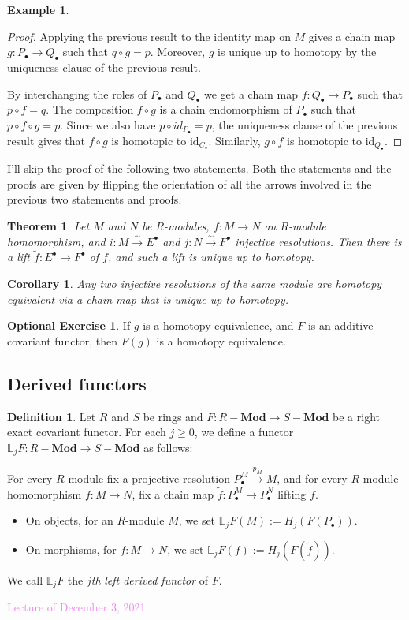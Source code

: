 \documentclass{amsart}[12pt]
\newcommand{\id}{\mathrm{id}}
\newcommand{\Dec}[1]{\textcolor{violet}{Lecture of December #1, 2021}}
\newcommand{\bL}{{\mathbb{L}}}
\newcommand{\DEF}[1]{\emph{#1}\index{#1}}
\numberwithin{equation}{section}
\theoremstyle{plain} %
\newtheorem{thm}[equation]{Theorem}
\newtheorem{cor}[equation]{Corollary}
\theoremstyle{definition}
\newtheorem{defn}[equation]{Definition}
\newtheorem{ex}[equation]{Example}
\newtheorem{exer}[equation]{Optional Exercise}
\theoremstyle{remark}
\newcommand{\ssec}[1]{\subsection{#1}}
\newcommand{\xra}[1]{\xrightarrow{#1}}
\newcommand{\Mod}[1]{#1-\mathbf{Mod}}
\begin{document}
\begin{ex}
\begin{proof} Applying the previous result to the identity
  map on $M$ gives a chain map $g: P_\bullet \to Q_\bullet$ such that $q \circ g = p$. Moreover, $g$ is unique up to homotopy by
the uniqueness clause of the previous result. 

By interchanging the roles of $P_\bullet$ and $Q_\bullet$ we get a chain map
$f: Q_\bullet \to P_\bullet$ such that $p \circ f = q$. The composition $f \circ g$ is a chain endomorphism of $P_\bullet$ such that $p \circ f \circ g =
p$. Since we also have $p \circ id_{P_\bullet} = p$, 
the uniqueness clause of the previous result gives that $f \circ g$ is homotopic to $\id_{C_\bullet}$. Similarly, 
$g \circ f$ is homotopic to $\id_{Q_\bullet}$. 
\end{proof}


I'll skip the proof of the following two statements. Both the statements and the proofs are given by flipping the orientation of all the arrows involved in the
previous two statements and proofs.

\begin{thm} \label{thm121c}
  Let $M$ and $N$ be $R$-modules, $f: M \to N$ an $R$-module homomorphism, and $i: M \xra{\sim} E^\bullet$ and $j: N \xra{\sim} F^\bullet$ injective resolutions. Then there is
a lift $\tilde{f}:E^\bullet \to F^\bullet$ of $f$, and such a lift is unique up to homotopy.
\end{thm}

\begin{cor} Any two injective resolutions of the same module are homotopy equivalent via a chain map that is unique up to homotopy. 
\end{cor}

\begin{exer} If $g$ is a homotopy equivalence, and $F$ is an additive covariant functor, then $F(g)$ is a homotopy equivalence.
\end{exer}


\ssec{Derived functors}


\begin{defn}
\label{def:leftderived}
 Let $R$ and $S$ be rings and $F: \Mod{R} \to \Mod{S}$ be a right exact covariant functor. 
For each $j \geq 0$, we define a functor $\bL_j F : \Mod{R} \to \Mod{S}$ as follows:

For every $R$-module fix a projective resolution $P_\bullet^M \xra{p_M} M$, and for every $R$-module homomorphism $f: M \to N$, fix a chain map $\tilde{f}: P_\bullet^M \to P_\bullet^N$ lifting $f$.
\begin{itemize}
\item On objects, for an $R$-module $M$, we set $\bL_j F(M) := H_j(F(P_\bullet)).$
\item On morphisms, for $f:M\to N$, we set $\bL_j F(f) := H_j(F(\tilde{f}))$.
\end{itemize} 
We call $\bL_j F$ the \emph{$j$th} \DEF{left derived functor} of $F$.
\end{defn}
\Dec{3}


\end{ex}
\end{document}
